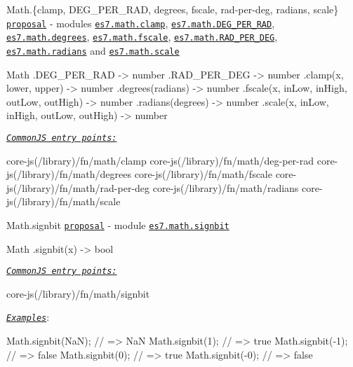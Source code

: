 \begin{DoxyItemize}
\item {\ttfamily Math.\{clamp, D\+E\+G\+\_\+\+P\+E\+R\+\_\+\+R\+AD, degrees, fscale, rad-\/per-\/deg, radians, scale\}} \href{https://github.com/rwaldron/proposal-math-extensions}{\tt proposal} -\/ modules \href{https://github.com/zloirock/core-js/blob/v2.6.0/modules/es7.math.clamp.js}{\tt {\ttfamily es7.\+math.\+clamp}}, \href{https://github.com/zloirock/core-js/blob/v2.6.0/modules/es7.math.DEG_PER_RAD.js}{\tt {\ttfamily es7.\+math.\+D\+E\+G\+\_\+\+P\+E\+R\+\_\+\+R\+AD}}, \href{https://github.com/zloirock/core-js/blob/v2.6.0/modules/es7.math.degrees.js}{\tt {\ttfamily es7.\+math.\+degrees}}, \href{https://github.com/zloirock/core-js/blob/v2.6.0/modules/es7.math.fscale.js}{\tt {\ttfamily es7.\+math.\+fscale}}, \href{https://github.com/zloirock/core-js/blob/v2.6.0/modules/es7.math.RAD_PER_DEG.js}{\tt {\ttfamily es7.\+math.\+R\+A\+D\+\_\+\+P\+E\+R\+\_\+\+D\+EG}}, \href{https://github.com/zloirock/core-js/blob/v2.6.0/modules/es7.math.radians.js}{\tt {\ttfamily es7.\+math.\+radians}} and \href{https://github.com/zloirock/core-js/blob/v2.6.0/modules/es7.math.scale.js}{\tt {\ttfamily es7.\+math.\+scale}} 
\begin{DoxyCode}
Math
  .DEG\_PER\_RAD -> number
  .RAD\_PER\_DEG -> number
  .clamp(x, lower, upper) -> number
  .degrees(radians) -> number
  .fscale(x, inLow, inHigh, outLow, outHigh) -> number
  .radians(degrees) -> number
  .scale(x, inLow, inHigh, outLow, outHigh) -> number
\end{DoxyCode}
 \href{#commonjs}{\tt {\itshape Common\+JS entry points\+:}} 
\begin{DoxyCode}
core-js(/library)/fn/math/clamp
core-js(/library)/fn/math/deg-per-rad
core-js(/library)/fn/math/degrees
core-js(/library)/fn/math/fscale
core-js(/library)/fn/math/rad-per-deg
core-js(/library)/fn/math/radians
core-js(/library)/fn/math/scale
\end{DoxyCode}

\item {\ttfamily Math.\+signbit} \href{http://jfbastien.github.io/papers/Math.signbit.html}{\tt proposal} -\/ module \href{https://github.com/zloirock/core-js/blob/v2.6.0/modules/es7.math.signbit.js}{\tt {\ttfamily es7.\+math.\+signbit}} 
\begin{DoxyCode}
Math
  .signbit(x) -> bool
\end{DoxyCode}
 \href{#commonjs}{\tt {\itshape Common\+JS entry points\+:}} 
\begin{DoxyCode}
core-js(/library)/fn/math/signbit
\end{DoxyCode}
 \href{http://es6.zloirock.ru/}{\tt {\itshape Examples}}\+: 
\begin{DoxyCode}
Math.signbit(NaN); // => NaN
Math.signbit(1);   // => true
Math.signbit(-1);  // => false
Math.signbit(0);   // => true
Math.signbit(-0);  // => false
\end{DoxyCode}

\end{DoxyItemize}

